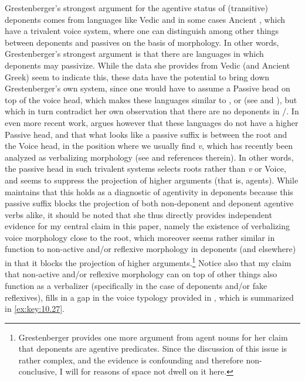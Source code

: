\documentclass[output=paper]{langsci/langscibook}
\begin{document}
Grestenberger’s strongest argument for the agentive status of (transitive)
deponents comes from languages like Vedic and in some cases Ancient ,
which have a trivalent voice system, where one can distinguish among other
things between deponents and passives on the basis of morphology. In other
words, Grestenberger’s strongest argument is that there are languages in which
deponents may passivize. While the data she provides from Vedic (and Ancient
Greek) seem to indicate this, these data have the potential to bring down
Grestenberger’s own system, since one would have to assume a Passive head on
top of the voice head, which makes these languages similar to , 
or  (see \citealt{Alexiadou2013} and \citealt{AlexiadouEtAl2015}), but
which in turn contradict her own observation that there are no deponents in
/. In even more recent work, \citet{Grestenberger2018b} argues
however that these languages do not have a higher Passive head, and that what
looks like a passive suffix is between the root and the Voice head, in the
position where we usually find \emph{v}, which has recently been analyzed as
verbalizing morphology (see \citealt{AlexiadouEtAl2015} and references
therein). In other words, the passive head in such trivalent systems selects
roots rather than \emph{v} or Voice, and seems to suppress the projection of
higher arguments (that is, agents). While \citeauthor{Grestenberger2014}
maintains that this holds as a diagnostic of agentivity in deponents because
this passive suffix blocks the projection of both non-deponent and deponent
agentive verbs alike, it should be noted that she thus directly provides
independent evidence for my central claim in this paper, namely the existence
of verbalizing voice morphology close to the root, which moreover seems rather
similar in function to non-active and/or reflexive morphology in deponents (and
elsewhere) in that it blocks the projection of higher
arguments.\footnote{Grestenberger provides one more argument from agent nouns
    for her claim that deponents are agentive predicates. Since the discussion
    of this issue is rather complex, and the evidence is confounding and
therefore non-conclusive, I will for reasons of space not dwell on it here.}
Notice also that my claim that non-active and/or reflexive morphology can on
top of other things also function as a verbalizer (specifically in the case of
deponents and/or fake reflexives), fills in a gap in the voice typology
provided in \citet{Schäfer2008}, which is summarized in \eqref{ex:key:10.27}.
\end{document}
